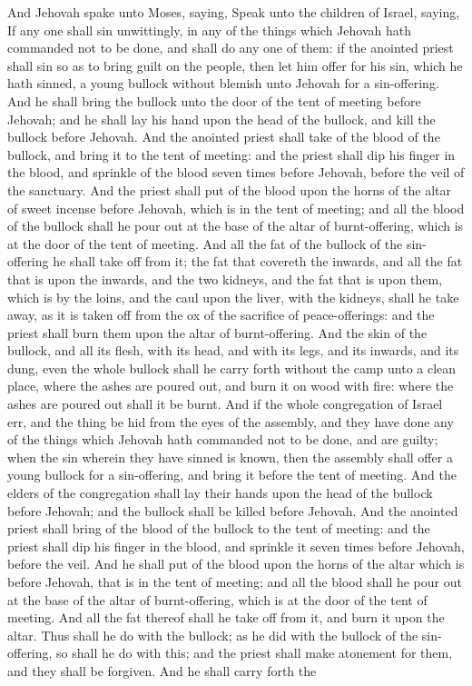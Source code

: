 And Jehovah spake unto Moses, saying, Speak unto the children of Israel, saying, If any one shall sin unwittingly, in any of the things which Jehovah hath commanded not to be done, and shall do any one of them: if the anointed priest shall sin so as to bring guilt on the people, then let him offer for his sin, which he hath sinned, a young bullock without blemish unto Jehovah for a sin-offering. And he shall bring the bullock unto the door of the tent of meeting before Jehovah; and he shall lay his hand upon the head of the bullock, and kill the bullock before Jehovah. And the anointed priest shall take of the blood of the bullock, and bring it to the tent of meeting: and the priest shall dip his finger in the blood, and sprinkle of the blood seven times before Jehovah, before the veil of the sanctuary. And the priest shall put of the blood upon the horns of the altar of sweet incense before Jehovah, which is in the tent of meeting; and all the blood of the bullock shall he pour out at the base of the altar of burnt-offering, which is at the door of the tent of meeting. And all the fat of the bullock of the sin-offering he shall take off from it; the fat that covereth the inwards, and all the fat that is upon the inwards, and the two kidneys, and the fat that is upon them, which is by the loins, and the caul upon the liver, with the kidneys, shall he take away, as it is taken off from the ox of the sacrifice of peace-offerings: and the priest shall burn them upon the altar of burnt-offering. And the skin of the bullock, and all its flesh, with its head, and with its legs, and its inwards, and its dung, even the whole bullock shall he carry forth without the camp unto a clean place, where the ashes are poured out, and burn it on wood with fire: where the ashes are poured out shall it be burnt.  And if the whole congregation of Israel err, and the thing be hid from the eyes of the assembly, and they have done any of the things which Jehovah hath commanded not to be done, and are guilty; when the sin wherein they have sinned is known, then the assembly shall offer a young bullock for a sin-offering, and bring it before the tent of meeting. And the elders of the congregation shall lay their hands upon the head of the bullock before Jehovah; and the bullock shall be killed before Jehovah. And the anointed priest shall bring of the blood of the bullock to the tent of meeting: and the priest shall dip his finger in the blood, and sprinkle it seven times before Jehovah, before the veil. And he shall put of the blood upon the horns of the altar which is before Jehovah, that is in the tent of meeting; and all the blood shall he pour out at the base of the altar of burnt-offering, which is at the door of the tent of meeting. And all the fat thereof shall he take off from it, and burn it upon the altar. Thus shall he do with the bullock; as he did with the bullock of the sin-offering, so shall he do with this; and the priest shall make atonement for them, and they shall be forgiven. And he shall carry forth the 